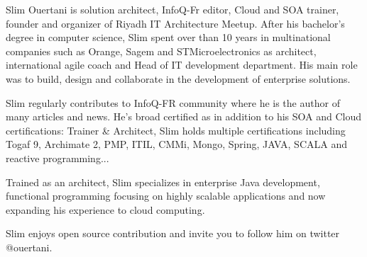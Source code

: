 \documentclass[10pt,a4paper]{article}
\begin{document}
\vspace{-1.3em}  %
\begin{multicols}{2}  %
\hspace{0.5cm} Slim Ouertani is solution architect, InfoQ-Fr editor, Cloud and SOA trainer, founder and organizer of Riyadh IT Architecture Meetup.
After his bachelor's degree in computer science, Slim spent over than 10 years in multinational companies such as Orange, Sagem and STMicroelectronics as architect, international agile coach and Head of IT development department.
His main role was to build, design and collaborate in the development of enterprise solutions.

\hspace{0.5cm} Slim regularly contributes to InfoQ-FR community where he is the author of many articles and news.
He's broad certified as in addition to his SOA and Cloud certifications: Trainer \& Architect, Slim  holds multiple certifications including Togaf 9, Archimate 2, PMP, ITIL, CMMi, Mongo, Spring, JAVA, SCALA and reactive programming...

\hspace{0.5cm} Trained as an architect, Slim specializes in enterprise Java development, functional programming focusing on highly scalable applications and now expanding his experience to cloud computing.

\hspace{0.5cm} Slim enjoys open source contribution and invite you to follow him on twitter @ouertani.

\end{multicols}


\spacedhrule{0em}{-0.4em}

\end{document}
